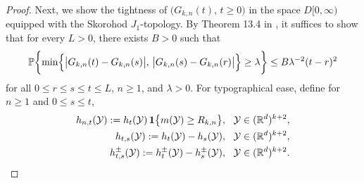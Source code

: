 \documentclass[11pt]{amsart}
\numberwithin{equation}{section}
\theoremstyle{plain}
\theoremstyle{definition}
\begin{document}
\begin{proof}
Next, we show the tightness of $\bigl( G_{k,n}(t), \, t\geq 0 \bigr)$ in the space $D[0,\infty)$ equipped with the Skorohod $J_1$-topology. By Theorem 13.4 in \cite{billingsley:1999}, it suffices to show that for every $L>0$, there exists $B>0$ such that
$$
{\mathbb{P}} \biggl\{ \min \Bigl\{ \bigl|  G_{k,n}(t) - G_{k,n}(s) \bigr|, \, \bigl|  G_{k,n}(s) - G_{k,n}(r) \bigr| \Bigr\} \geq \lambda \biggr\} \leq B \lambda^{-2} (t-r)^2
$$
for all $0 \leq r \leq s \leq t \leq L$, $n \geq 1$, and $\lambda > 0$. For typographical ease, define for $n \geq 1$ and $0 \leq s \leq t$,
\begin{align}
h_{n,t}({{\mathcal{Y}}}) := h_t ({{\mathcal{Y}}})\, {{\bf 1}} \bigl\{  m({{\mathcal{Y}}}) \geq R_{k,n} \bigr\}, \ \ {{\mathcal{Y}}} \in ({{\mathbb R}}^d)^{k+2}, \notag \\
h_{t,s}({{\mathcal{Y}}}) := h_t ({{\mathcal{Y}}}) - h_s({{\mathcal{Y}}}), \ \ {{\mathcal{Y}}} \in ({{\mathbb R}}^d)^{k+2}, \notag \\
h_{t,s}^{\pm}({{\mathcal{Y}}}) := h_t^{\pm} ({{\mathcal{Y}}}) - h_s^{\pm}({{\mathcal{Y}}}), \ \ {{\mathcal{Y}}} \in ({{\mathbb R}}^d)^{k+2}. \label{e:def.htspm}
\end{align}


\end{proof}
\end{document}
